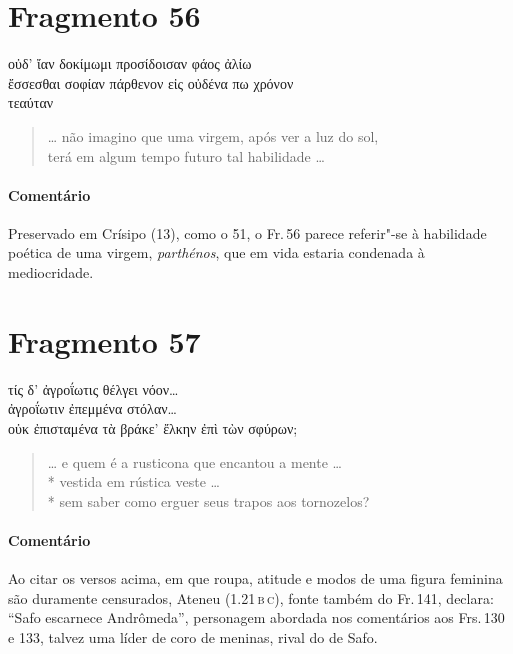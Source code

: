 \pagebreak
\section{Fragmento 56}

\begin{gkverse}
οὐδ’ ἴαν δοκίμωμι προσίδοισαν φάος ἀλίω\\
ἔσσεσθαι σοφίαν πάρθενον εἰς οὐδένα πω χρόνον\\
τεαύταν
\end{gkverse}

\begin{verse}
\ldots{} não imagino que uma virgem, após ver a luz do sol,\\
terá em algum tempo futuro tal habilidade \ldots{}
\end{verse}

\medskip

{\paragraph{Comentário} Preservado em Crísipo (13), como o 51, o Fr.\,56 parece referir"-se à habilidade
poética de uma virgem, \textit{parthénos}, que em vida estaria condenada à
mediocridade.}


\section{Fragmento 57}

\begin{gkverse}
τίς δ’ ἀγροΐωτις θέλγει νόον\ldots{}\\
ἀγροΐωτιν ἐπεμμένα στόλαν\ldots{}\\
οὐκ ἐπισταμένα τὰ βράκε’ ἔλκην ἐπὶ τὼν σφύρων;
\end{gkverse}

\begin{verse}
\ldots{} e quem é a rusticona que encantou a mente \ldots{}\\*
vestida em rústica veste \ldots{}\\*
sem saber como erguer seus trapos aos tornozelos?
\end{verse}

\medskip

{\paragraph{Comentário} Ao citar os versos acima, em que roupa, atitude e modos de uma figura feminina são
duramente censurados, Ateneu (1.21\,\textsc{b}\,\textsc{c}), fonte também do Fr.\,141, declara: ``Safo
escarnece Andrômeda'', personagem abordada nos comentários aos Frs.\,130 e 133, talvez uma líder de coro de meninas, rival do de Safo.}


